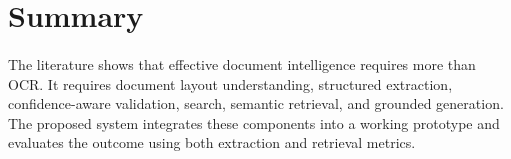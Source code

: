 \section{Summary}
\paragraph{} The literature shows that effective document intelligence requires more than OCR. It requires document layout understanding, structured extraction, confidence-aware validation, search, semantic retrieval, and grounded generation. The proposed system integrates these components into a working prototype and evaluates the outcome using both extraction and retrieval metrics.
